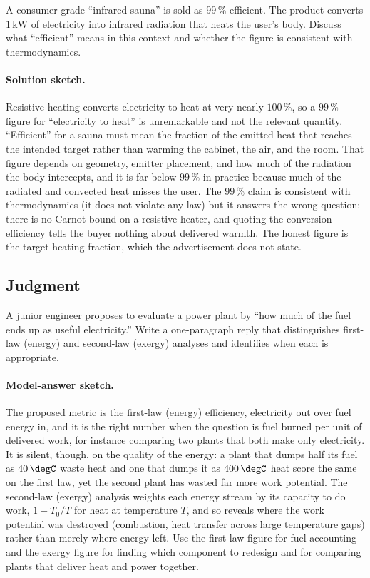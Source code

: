 \begin{exercise}
A consumer-grade ``infrared sauna'' is sold as $99\,\%$ efficient. The
product converts $1\,\text{kW}$ of electricity into infrared radiation
that heats the user's body. Discuss what ``efficient'' means in this
context and whether the figure is consistent with thermodynamics.

\paragraph{Solution sketch.} Resistive heating converts electricity to
heat at very nearly $100\,\%$, so a $99\,\%$ figure for ``electricity to
heat'' is unremarkable and not the relevant quantity. ``Efficient'' for
a sauna must mean the fraction of the emitted heat that reaches the
intended target rather than warming the cabinet, the air, and the room.
That figure depends on geometry, emitter placement, and how much of the
radiation the body intercepts, and it is far below $99\,\%$ in practice
because much of the radiated and convected heat misses the user. The
$99\,\%$ claim is consistent with thermodynamics (it does not violate
any law) but it answers the wrong question: there is no Carnot bound on
a resistive heater, and quoting the conversion efficiency tells the
buyer nothing about delivered warmth. The honest figure is the
target-heating fraction, which the advertisement does not state.
\end{exercise}

\subsection*{Judgment}

\begin{exercise}
A junior engineer proposes to evaluate a power plant by ``how much
of the fuel ends up as useful electricity.'' Write a one-paragraph
reply that distinguishes first-law (energy) and second-law (exergy)
analyses and identifies when each is appropriate.

\paragraph{Model-answer sketch.} The proposed metric is the first-law
(energy) efficiency, electricity out over fuel energy in, and it is the
right number when the question is fuel burned per unit of delivered
work, for instance comparing two plants that both make only
electricity. It is silent, though, on the quality of the energy: a plant
that dumps half its fuel as $40\,\degC$ waste heat and one that dumps it
as $400\,\degC$ heat score the same on the first law, yet the second
plant has wasted far more work potential. The second-law (exergy)
analysis weights each energy stream by its capacity to do work, $1 -
T_0/T$ for heat at temperature $T$, and so reveals where the work
potential was destroyed (combustion, heat transfer across large
temperature gaps) rather than merely where energy left. Use the
first-law figure for fuel accounting and the exergy figure for finding
which component to redesign and for comparing plants that deliver heat
and power together.
\end{exercise}

